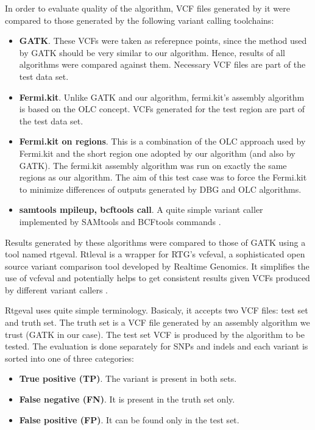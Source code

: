 In order to evaluate quality of the algorithm, VCF files generated by it were compared to those generated by the following variant calling toolchains:
\begin{itemize}
\item \textbf{GATK}. These VCFs were taken as referepnce points, since the method used by GATK should be very similar to our algorithm. Hence, results of all algorithms were compared against them. Necessary VCF files are part of the test data set.
\item \textbf{Fermi.kit}. Unlike GATK and our algorithm, fermi.kit's assembly algorithm is based on the OLC concept. VCFs generated for the test region are part of the test data set.
\item \textbf{Fermi.kit on regions}. This is a combination of the OLC approach used by Fermi.kit and the short region one adopted by our algorithm (and also by GATK). The fermi.kit assembly algorithm was run on exactly the same regions as our algorithm. The aim of this test case was to force the Fermi.kit to minimize differences of outputs generated by DBG and OLC algorithms.
\item \textbf{samtools mpileup, bcftools call}. A quite simple variant caller implemented by SAMtools and BCFtools commands \cite{samtools}.
\end{itemize}

Results generated by these algorithms were compared to those of GATK using a tool named rtgeval. Rtleval is a wrapper for RTG's vcfeval, a sophisticated open source variant comparison tool developed by Realtime Genomics. It simplifies the use of vcfeval and potentially helps to get consistent results given VCFs produced by different variant callers \cite{rtgeval}.

Rtgeval uses quite simple terminology. Basicaly, it accepts two VCF files: test set and truth set. The truth set is a VCF file generated by an assembly algorithm we trust (GATK in our case). The test set VCF is produced by the algorithm to be tested. The evaluation is done separately for SNPs and indels and each variant is sorted into one of three categories:
\begin{itemize}
\item \textbf{True positive (TP)}. The variant is present in both sets.
\item \textbf{False negative (FN)}. It is present in the truth set only.
\item \textbf{False positive (FP)}. It can be found only in the test set.
\end{itemize}

